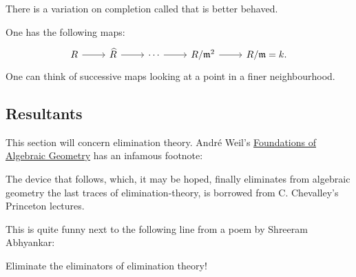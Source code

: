 \documentclass [11 pt, oneside, margin = 1 in] {article}
\begin{document}
\begin{remark}
	There is a variation on completion called  that is better behaved.
\end{remark}

One has the following maps:
\[
\begin{tikzcd}
	R\ar[r]&\widehat{R}\ar[r] &\cdots\ar[r] & R/\mathfrak{m}^2 \ar[r]& R/\mathfrak{m} = k.
\end{tikzcd}
\]
One can think of successive maps looking at a point in a finer neighbourhood.


\subsection{Resultants}
This section will concern elimination theory. Andr\'e Weil's \underline{Foundations of Algebraic Geometry} has an infamous footnote:
\begin{center}
	\small The device that follows, which, it may be hoped, finally eliminates from algebraic geometry the last traces of elimination-theory, is borrowed from C. Chevalley's Princeton lectures.
\end{center}
This is quite funny next to the following line from a poem by Shreeram Abhyankar:
\begin{center}
	\small Eliminate the eliminators of elimination theory!
\end{center}
\end{document}
